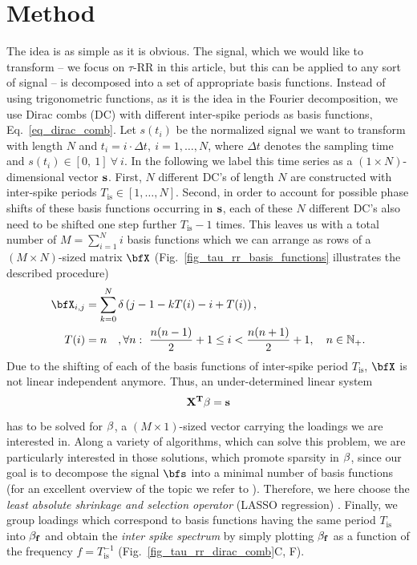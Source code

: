 \section{Method}\label{sec_tau_rr_method}
    
The idea is as simple as it is obvious. The signal, which we would like to transform -- we focus on $\tau$-RR in this article, but this can be applied to any sort of signal -- 
is decomposed into a set of appropriate basis functions. Instead of using trigonometric functions, as it is the idea in the Fourier decomposition, we use Dirac combs (DC) with 
different inter-spike periods as basis functions, Eq.~\eqref{eq_dirac_comb}. Let $s(t_i)$ be the normalized signal we want to transform with length $N$ and 
$t_i=i\cdot \Delta t,~i=1,\ldots,N$, where $\Delta t$ denotes the sampling time and $s(t_i) \in [0,\ 1]\ \forall\ i$. In the following we label this time series as a $(1\times N)$-dimensional vector $\bf{s}$. 
First, $N$ different DC's of length $N$ are constructed with inter-spike periods $T_\text{is} \in [1,\ldots,N]$. Second, in order to account for possible phase shifts of 
these basis functions occurring 
in $\bf{s}$, each of these $N$ different DC's also need to be shifted one step further $T_\text{is}-1$ times. This leaves us with a total number of $M = \sum_{i=1}^{N}i$ 
basis functions which we can arrange as rows of a $(M\times N)$-sized matrix $\bfX$
(Fig.~\ref{fig_tau_rr_basis_functions} illustrates the described procedure)
\begin{align}
\bfX_{i,j} &= \sum_{k=0}^N\delta\left(j-1-kT(i)-i+T(i) \right),\\
T(i)&= n \quad, \forall n:~ \frac{n(n-1)}{2} + 1 \leq i <  \frac{n(n+1)}{2} + 1,\quad n \in \mathbb{N}_+.
\label{eq_basis_matrix}
\end{align}
Due to the shifting of each of the basis functions of inter-spike period $T_\text{is}$, 
$\bfX$ is not linear independent anymore. Thus, an under-determined linear system
\begin{equation}
\bf{X}^T\bf{\beta}=\bf{s}
\label{eq_linear_system}
\end{equation}  
has to be solved for $\bf{\beta}$, a $(M\times 1)$-sized vector carrying the loadings we are interested in. Along a variety of algorithms, which can solve this problem, we are 
particularly interested in those solutions, which promote sparsity in $\bf{\beta}$, since our goal is to decompose the signal $\bfs$ into a minimal number of basis 
functions (for an excellent overview of the topic we refer to \citet{Brunton2019}). Therefore, we here choose the \textit{least absolute shrinkage and selection operator} 
(LASSO regression) \cite{Tibshirani1996}. Finally, we group loadings which correspond to basis functions having the same period $T_\text{is}$ into $\bf{\beta}_f$ and obtain the 
\textit{inter spike spectrum} by simply plotting $\bf{\beta}_f$ as a function of the frequency $f=T_\text{is}^{-1}$ (Fig.~\ref{fig_tau_rr_dirac_comb}C, F).

